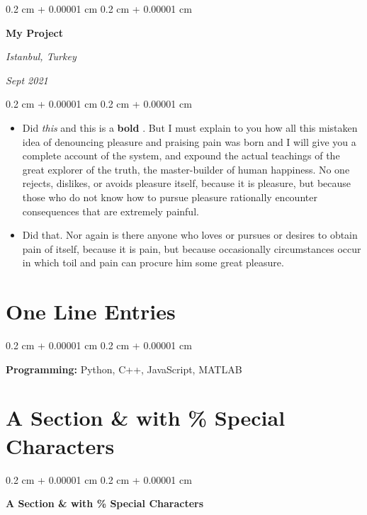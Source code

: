 \documentclass[10pt, letterpaper]{article}
\newenvironment{highlights}{
    \begin{itemize}[
        topsep=0.10 cm,
        parsep=0.10 cm,
        partopsep=0pt,
        itemsep=0pt,
        leftmargin=0.4 cm + 10pt
    ]
}{
    \end{itemize}
} %
\newenvironment{onecolentry}{
    \begin{adjustwidth}{
        0.2 cm + 0.00001 cm
    }{
        0.2 cm + 0.00001 cm
    }
}{
    \end{adjustwidth}
} %
\newenvironment{twocolentry}[2][]{
    \onecolentry
    \def\secondColumn{#2}
    \setcolumnwidth{\fill, 4.5 cm}
    \begin{paracol}{2}
}{
    \switchcolumn \raggedleft \secondColumn
    \end{paracol}
    \endonecolentry
} %
\let\hrefWithoutArrow\href
\renewcommand{\href}[2]{\hrefWithoutArrow{#1}{\ifthenelse{\equal{#2}{}}{ }{#2 }\raisebox{.15ex}{\footnotesize \faExternalLink*}}}
\begin{document}
        \vspace{0.2 cm}

        \begin{twocolentry}{
        \textit{Istanbul, Turkey}    
            
        \textit{Sept 2021}}
            \textbf{My Project}
        \end{twocolentry}

        \vspace{0.10 cm}
        \begin{onecolentry}
            \begin{highlights}
                \item Did \textit{this} and this is a \textbf{bold} \href{https://example.com}{link}. But I must explain to you how all this mistaken idea of denouncing pleasure and praising pain was born and I will give you a complete account of the system, and expound the actual teachings of the great explorer of the truth, the master-builder of human happiness. No one rejects, dislikes, or avoids pleasure itself, because it is pleasure, but because those who do not know how to pursue pleasure rationally encounter consequences that are extremely painful.
                \item Did that. Nor again is there anyone who loves or pursues or desires to obtain pain of itself, because it is pain, but because occasionally circumstances occur in which toil and pain can procure him some great pleasure.
            \end{highlights}
        \end{onecolentry}



    
    \section{One Line Entries}



        
        \begin{onecolentry}
            \textbf{Pro\textnormal{gram}ming:} Python, C++, JavaScript, MATLAB
        \end{onecolentry}


    
    \section{A Section \& with \% Special Characters}



        
        \begin{onecolentry}
            \textbf{A Section \& with \% Special Characters}
        \end{onecolentry}




    
\end{document}
